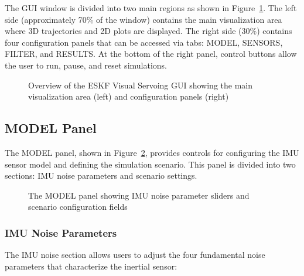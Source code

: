 \documentclass[11pt,a4paper]{article}
\begin{document}
The GUI window is divided into two main regions as shown in Figure~\ref{fig:gui_overview}. The left side (approximately 70\% of the window) contains the main visualization area where 3D trajectories and 2D plots are displayed. The right side (30\%) contains four configuration panels that can be accessed via tabs: MODEL, SENSORS, FILTER, and RESULTS. At the bottom of the right panel, control buttons allow the user to run, pause, and reset simulations.

\begin{figure}[h]
    \centering
    \caption{Overview of the ESKF Visual Servoing GUI showing the main visualization area (left) and configuration panels (right)}
    \label{fig:gui_overview}
\end{figure}

\subsection{MODEL Panel}

The MODEL panel, shown in Figure~\ref{fig:model_panel}, provides controls for configuring the IMU sensor model and defining the simulation scenario. This panel is divided into two sections: IMU noise parameters and scenario settings.

\begin{figure}[h]
    \centering
    \caption{The MODEL panel showing IMU noise parameter sliders and scenario configuration fields}
    \label{fig:model_panel}
\end{figure}

\subsubsection{IMU Noise Parameters}
The IMU noise section allows users to adjust the four fundamental noise parameters that characterize the inertial sensor:
\end{document}
